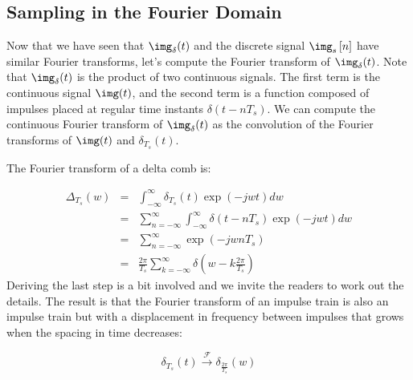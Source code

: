 \subsection{Sampling in the Fourier Domain}

Now that we have seen that $\img_{\delta} (t)$ and the discrete signal $\img_s  \left[n \right]$ have similar Fourier transforms, let's compute the Fourier transform of $\img_{\delta} (t)$. Note that $\img_{\delta} (t)$ is the product of two continuous signals. The first term is the continuous signal $\img(t)$, and the second term is a function composed of impulses placed at regular time instants $\delta(t-n T_s)$. We can compute the continuous Fourier transform of $\img_{\delta} (t)$ as the convolution of the Fourier transforms of $\img(t)$ and $\delta_{T_s}(t)$. 



The Fourier transform of a delta comb is:


\begin{eqnarray}
\Delta_{T_s} (w) &=& \int_{-\infty}^{\infty}  \delta_{T_s}(t) \exp \left(-jwt\right) dw \nonumber \\ 
&=&\sum_{n=-\infty}^{\infty} \int_{-\infty}^{\infty}  \delta(t-n T_s) \exp \left(-jwt\right) dw \nonumber \\
&=&\sum_{n=-\infty}^{\infty}  \exp \left(-jwnT_s\right) \nonumber \\
&=& \frac{2\pi}{T_s} \sum_{k=-\infty}^{\infty} \delta \left(w-k \frac{2 \pi}{T_s} \right)
\end{eqnarray}
Deriving the last step is a bit involved and we invite the readers to work out the details. The result is that the Fourier transform of an impulse train is also an impulse train but with a displacement in frequency between impulses that grows when the spacing in time decreases: 

\begin{equation}
\delta_{T_s}(t) 
\xrightarrow{\mathscr{F}} 
\delta_{\frac{2 \pi}{T_s}}(w)
\end{equation}



